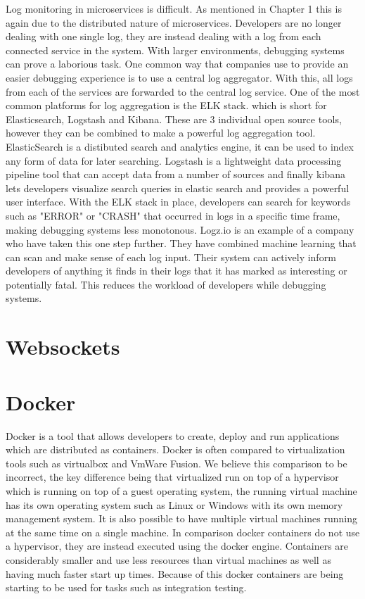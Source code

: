 Log monitoring in microservices is difficult. As mentioned in Chapter 1 this is again due to the distributed nature of microservices. Developers are no longer dealing with one single log, they are instead dealing with a log from each connected service in the system. With larger environments, debugging systems can prove a laborious task. One common way that companies use to provide an easier debugging experience is to use a central log aggregator. With this, all logs from each of the services are forwarded to the central log service. One of the most common platforms for log aggregation is the ELK stack. which is short for Elasticsearch, Logstash and Kibana. These are 3 individual open source tools, however they can be combined to make a powerful log aggregation tool. ElasticSearch is a distibuted search and analytics engine, it can be used to index any form of data for later searching. Logstash is a lightweight data processing pipeline tool that can accept data from a number of sources and finally kibana lets developers visualize search queries in elastic search and provides a powerful user interface. With the ELK stack in place, developers can search for keywords such as "ERROR" or "CRASH" that occurred in logs in a specific time frame, making debugging systems less monotonous. Logz.io is an example of a company who have taken this one step further. They have combined machine learning that can scan and make sense of each log input. Their system can actively inform developers of anything it finds in their logs that it has marked as interesting or potentially fatal. This reduces the workload of developers while debugging systems.

\section{Websockets}

\section{Docker}

Docker is a tool that allows developers to create, deploy and run applications which are distributed as containers. Docker is often compared to virtualization tools such as virtualbox and VmWare Fusion. We believe this comparison to be incorrect, the key difference being that virtualized run on top of a hypervisor which is running on top of a guest operating system, the running virtual machine has its own operating system such as Linux or Windows with its own memory management system. It is also possible to have multiple virtual machines running at the same time on a single machine. In comparison docker containers do not use a hypervisor, they are instead executed using the docker engine. Containers are considerably smaller and use less resources than virtual machines as well as having much faster start up times. Because of this docker containers are being starting to be used for tasks such as integration testing.

